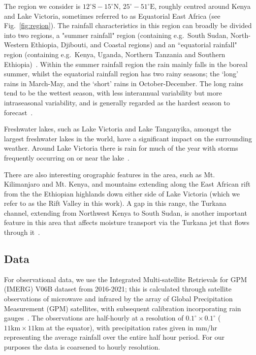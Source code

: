 \documentclass{article}
\begin{document}
The region we consider is $12^{\circ}\text{S}-15^{\circ}\text{N}$, $25^{\circ}-51^{\circ}\text{E}$, roughly centred around Kenya and Lake Victoria, sometimes referred to as Equatorial East Africa (see Fig.~\ref{fig:region}). The rainfall characteristics in this region can broadly be divided into two regions, a "summer rainfall" region (containing e.g.~South Sudan, North-Western Ethiopia, Djibouti, and Coastal regions) and an ``equatorial rainfall" region (containing e.g.~Kenya, Uganda, Northern Tanzania and Southern Ethiopia)~\citep{nicholson_climate_2017}. Within the summer rainfall region the rain mainly falls in the boreal summer, whilst the equatorial rainfall region has two rainy seasons; the `long' rains in March-May, and the `short' rains in October-December. The long rains tend to be the wettest season, with less interannual variability but more intraseasonal variability, and is generally regarded as the hardest season to forecast~\citep{nicholson_climate_2017, walker_skill_2019, kilavi_extreme_2018}.

Freshwater lakes, such as Lake Victoria and Lake Tanganyika, amongst the largest freshwater lakes in the world, have a significant impact on the surrounding weather. Around Lake Victoria there is rain for much of the year with storms frequently occurring on or near the lake~\citep{macleod_drivers_2021, chamberlain_forecasting_2014, woodhams_identifying_2019}.

There are also interesting orographic features in the area, such as Mt. Kilimanjaro and Mt. Kenya, and mountains extending along the East African rift from the the Ethiopian highlands down either side of Lake Victoria (which we refer to as the Rift Valley in this work). A gap in this range, the Turkana channel, extending from Northwest Kenya to South Sudan, is another important feature in this area that affects moisture transport via the Turkana jet that flows through it~\citep{nicholson_turkana_2016}.


\subsection{Data}

\label{sec:data}


For observational data, we use the Integrated Multi-satellite Retrievals for GPM (IMERG) V06B dataset from 2016-2021; this is calculated through satellite observations of microwave and infrared by the array of Global Precipitation Measurement (GPM) satellites, with subsequent calibration incorporating rain gauges~\citep{huffman_integrated_2023}. The observations are half-hourly at a resolution of $0.1^{\circ} \times 0.1^{\circ}$ ($11\text{km} \times 11\text{km}$ at the equator), with precipitation rates given in mm/hr representing the average rainfall over the entire half hour period. For our purposes the data is coarsened to hourly resolution.
\end{document}
